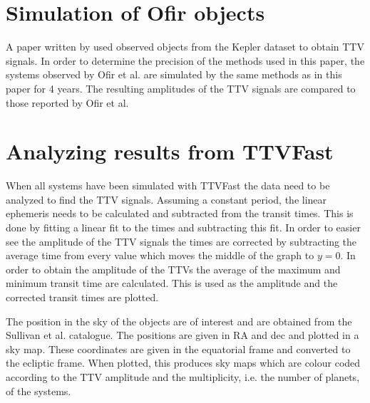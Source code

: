 \documentclass[12pt]{report}
\begin{document}
\section{Simulation of Ofir objects}
	A paper written by \cite{2018ApJS..234....9O} used observed objects from the Kepler dataset to obtain TTV signals. In order to determine the precision of the methods used in this paper, the systems observed by Ofir et al. are simulated by the same methods as in this paper for 4 years. The resulting amplitudes of the TTV signals are compared to those reported by Ofir et al.
\section{Analyzing results from TTVFast}
\label{analMethod}
	When all systems have been simulated with TTVFast the data need to be analyzed to find the TTV signals. Assuming a constant period, the linear ephemeris needs to be calculated and subtracted from the transit times. This is done by fitting a linear fit to the times and subtracting this fit. In order to easier see the amplitude of the TTV signals the times are corrected by subtracting the average time from every value which moves the middle of the graph to $y=0$. In order to obtain the amplitude of the TTVs the average of the maximum and minimum transit time are calculated. This is used as the amplitude and the corrected transit times are plotted.
	
	The position in the sky of the objects are of interest and are obtained from the Sullivan et al. catalogue. The positions are given in RA and dec and plotted in a sky map. These coordinates are given in the equatorial frame and converted to the ecliptic frame. When plotted, this produces sky maps which are colour coded according to the TTV amplitude and the multiplicity, i.e. the number of planets, of the systems.
	
\end{document}
